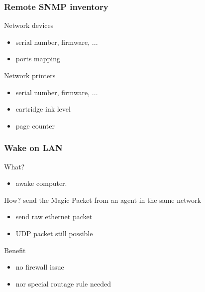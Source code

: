 \begin{frame}
    \frametitle{Remote SNMP inventory}

    \begin{block}{Network devices}
        \begin{itemize}
            \item serial number, firmware, ...
            \item ports mapping
        \end{itemize}
    \end{block}

    \begin{block}{Network printers}
        \begin{itemize}
            \item serial number, firmware, ...
            \item cartridge ink level
            \item page counter
        \end{itemize}
    \end{block}
\end{frame}

\begin{frame}
    \frametitle{Wake on LAN}

    \begin{block}{What?}
    \begin{itemize}
        \item awake computer.
    \end{itemize}
    \end{block}

\pause

    \begin{block}{How?}
    send the Magic Packet from an agent in the same network
    \begin{itemize}
        \item send raw ethernet packet
        \item UDP packet still possible
    \end{itemize}
    \end{block}

\pause

    \begin{block}{Benefit}
    \begin{itemize}
        \item no firewall issue
        \item nor special routage rule needed
    \end{itemize}
    \end{block}

\end{frame}

